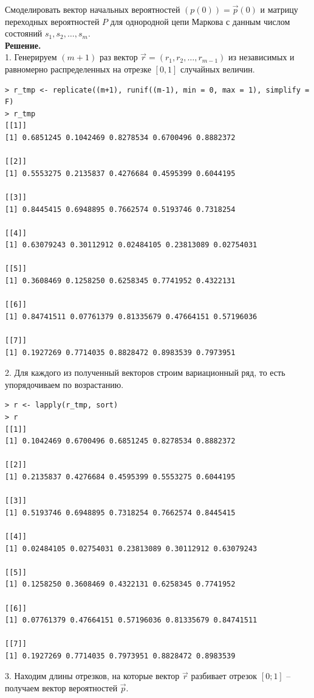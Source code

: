 \documentclass[14pt,a4paper]{scrartcl}
\begin{document}
Смоделировать вектор начальных вероятностей $(p(0)) = \vec{p}(0)$ и матрицу переходных вероятностей $P$ для однородной цепи Маркова с данным числом состояний ${s_1,s_2,…,s_m}$.\\
\textbf{Решение.}\\
1. Генерируем $(m+1)$ раз вектор $\vec{r}=(r_1,r_2,…,r_{m-1})$ из независимых и равномерно распределенных на отрезке $[0,1]$ случайных величин.
\begin{verbatim}
> r_tmp <- replicate((m+1), runif((m-1), min = 0, max = 1), simplify = F)
> r_tmp
[[1]]
[1] 0.6851245 0.1042469 0.8278534 0.6700496 0.8882372

[[2]]
[1] 0.5553275 0.2135837 0.4276684 0.4595399 0.6044195

[[3]]
[1] 0.8445415 0.6948895 0.7662574 0.5193746 0.7318254

[[4]]
[1] 0.63079243 0.30112912 0.02484105 0.23813089 0.02754031

[[5]]
[1] 0.3608469 0.1258250 0.6258345 0.7741952 0.4322131

[[6]]
[1] 0.84741511 0.07761379 0.81335679 0.47664151 0.57196036

[[7]]
[1] 0.1927269 0.7714035 0.8828472 0.8983539 0.7973951
\end{verbatim}


2. Для каждого из полученный векторов строим вариационный ряд, то есть упорядочиваем по возрастанию.

\begin{verbatim}
> r <- lapply(r_tmp, sort)
> r
[[1]]
[1] 0.1042469 0.6700496 0.6851245 0.8278534 0.8882372

[[2]]
[1] 0.2135837 0.4276684 0.4595399 0.5553275 0.6044195

[[3]]
[1] 0.5193746 0.6948895 0.7318254 0.7662574 0.8445415

[[4]]
[1] 0.02484105 0.02754031 0.23813089 0.30112912 0.63079243

[[5]]
[1] 0.1258250 0.3608469 0.4322131 0.6258345 0.7741952

[[6]]
[1] 0.07761379 0.47664151 0.57196036 0.81335679 0.84741511

[[7]]
[1] 0.1927269 0.7714035 0.7973951 0.8828472 0.8983539
\end{verbatim}

3. Находим длины отрезков, на которые вектор $\vec{r}$ разбивает отрезок $[0;1]$ -- получаем вектор вероятностей $\vec{p}$.
\end{document}
